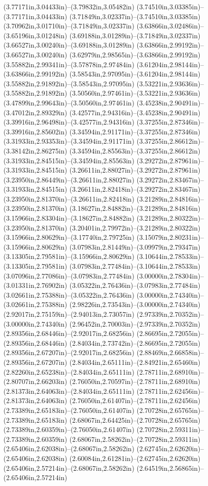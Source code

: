 (3.77171in,3.04433in)--(3.79832in,3.05482in) (3.74510in,3.03385in)--(3.77171in,3.04433in) (3.71849in,3.02337in)--(3.74510in,3.03385in) (3.70962in,3.01710in)--(3.71849in,3.02337in) (3.63866in,3.02486in)--(3.65196in,3.01248in) (3.69188in,3.01289in)--(3.71849in,3.02337in) (3.66527in,3.00240in)--(3.69188in,3.01289in) (3.63866in,2.99192in)--(3.66527in,3.00240in) (3.62979in,2.98565in)--(3.63866in,2.99192in) (3.55882in,2.99341in)--(3.57878in,2.97484in) (3.61204in,2.98144in)--(3.63866in,2.99192in) (3.58543in,2.97095in)--(3.61204in,2.98144in) (3.55882in,2.91892in)--(3.58543in,2.97095in) (3.53221in,2.93636in)--(3.55882in,2.91892in) (3.50560in,2.97461in)--(3.53221in,2.93636in) (3.47899in,2.99643in)--(3.50560in,2.97461in) (3.45238in,2.90491in)--(3.47012in,2.89329in) (3.42577in,2.94316in)--(3.45238in,2.90491in) (3.39916in,2.96498in)--(3.42577in,2.94316in) (3.37255in,2.87346in)--(3.39916in,2.85602in) (3.34594in,2.91171in)--(3.37255in,2.87346in) (3.31933in,2.93353in)--(3.34594in,2.91171in) (3.37255in,2.86612in)--(3.38142in,2.86275in) (3.34594in,2.85563in)--(3.37255in,2.86612in) (3.31933in,2.84515in)--(3.34594in,2.85563in) (3.29272in,2.87961in)--(3.31933in,2.84515in) (3.26611in,2.88027in)--(3.29272in,2.87961in) (3.23950in,2.86449in)--(3.26611in,2.88027in) (3.29272in,2.83467in)--(3.31933in,2.84515in) (3.26611in,2.82418in)--(3.29272in,2.83467in) (3.23950in,2.81370in)--(3.26611in,2.82418in) (3.21289in,2.84816in)--(3.23950in,2.81370in) (3.18627in,2.84882in)--(3.21289in,2.84816in) (3.15966in,2.83304in)--(3.18627in,2.84882in) (3.21289in,2.80322in)--(3.23950in,2.81370in) (3.20401in,2.79972in)--(3.21289in,2.80322in) (3.15966in,2.80629in)--(3.17740in,2.79725in) (3.15079in,2.80231in)--(3.15966in,2.80629in) (3.07983in,2.81449in)--(3.09979in,2.79347in) (3.13305in,2.79581in)--(3.15966in,2.80629in) (3.10644in,2.78533in)--(3.13305in,2.79581in) (3.07983in,2.77484in)--(3.10644in,2.78533in) (3.07096in,2.77086in)--(3.07983in,2.77484in) (3.00000in,2.78304in)--(3.01331in,2.76902in) (3.05322in,2.76436in)--(3.07983in,2.77484in) (3.02661in,2.75388in)--(3.05322in,2.76436in) (3.00000in,2.74340in)--(3.02661in,2.75388in) (2.98226in,2.73543in)--(3.00000in,2.74340in) (2.92017in,2.75159in)--(2.94013in,2.73057in) (2.97339in,2.70352in)--(3.00000in,2.74340in) (2.96452in,2.70003in)--(2.97339in,2.70352in) (2.89356in,2.68446in)--(2.92017in,2.68256in) (2.86695in,2.72055in)--(2.89356in,2.68446in) (2.84034in,2.73742in)--(2.86695in,2.72055in) (2.89356in,2.67207in)--(2.92017in,2.68256in) (2.88469in,2.66858in)--(2.89356in,2.67207in) (2.84034in,2.65111in)--(2.84921in,2.65460in) (2.82260in,2.65238in)--(2.84034in,2.65111in) (2.78711in,2.68910in)--(2.80707in,2.66203in) (2.76050in,2.70597in)--(2.78711in,2.68910in) (2.81373in,2.64063in)--(2.84034in,2.65111in) (2.78711in,2.62456in)--(2.81373in,2.64063in) (2.76050in,2.61407in)--(2.78711in,2.62456in) (2.73389in,2.65183in)--(2.76050in,2.61407in) (2.70728in,2.65765in)--(2.73389in,2.65183in) (2.68067in,2.64425in)--(2.70728in,2.65765in) (2.73389in,2.60359in)--(2.76050in,2.61407in) (2.70728in,2.59311in)--(2.73389in,2.60359in) (2.68067in,2.58262in)--(2.70728in,2.59311in) (2.65406in,2.62038in)--(2.68067in,2.58262in) (2.62745in,2.62620in)--(2.65406in,2.62038in) (2.60084in,2.61281in)--(2.62745in,2.62620in) (2.65406in,2.57214in)--(2.68067in,2.58262in) (2.64519in,2.56865in)--(2.65406in,2.57214in) 